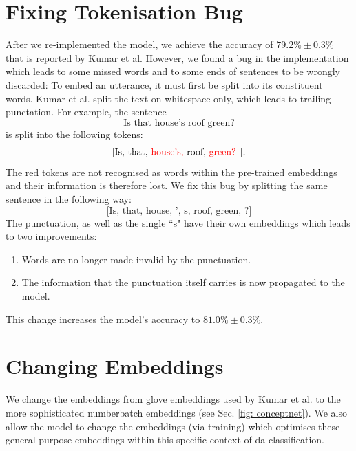     \section{Fixing Tokenisation Bug \label{sec: method tokenisation bug}}
        After we re-implemented the \gls{model}, we achieve the accuracy of $79.2\% \pm 0.3\%$ that is reported by Kumar et al.\cite{kumar2017dialogue}
        However, we found a bug in the implementation which leads to some missed words and to some ends of sentences to be wrongly discarded: To embed an \gls{utterance}, it must first be split into its constituent words. Kumar et al. split the text on whitespace only, which leads to trailing punctation. For example, the sentence
        \begin{equation*}
            \text{Is that house's roof green?}
        \end{equation*}
        is split into the following tokens:
        \begin{equation*}
            \text{[Is, that, \color{red} house's, \color{black} roof, \color{red} green? \color{black}]}.
        \end{equation*}
        The red tokens are not recognised as words within the pre-trained \glspl{embedding} and their information is therefore lost. We fix this bug by splitting the same sentence in the following way:
        \begin{equation*}
            \text{[Is, that, house, ', s, roof, green, ?]}
        \end{equation*}
        The punctuation, as well as the single ``s" have their own \glspl{embedding} which leads to two improvements:
        \begin{enumerate}
            \item Words are no longer made invalid by the punctuation.
            \item The information that the punctuation itself carries is now propagated to the \gls{model}.
        \end{enumerate}
        This change increases the \gls{model}'s accuracy to $81.0\% \pm 0.3\%$.



    \section{Changing Embeddings}
    We change the \glspl{embedding} from \gls{glove} \glspl{embedding} used by Kumar et al.\cite{kumar2017dialogue} to the more sophisticated \gls{numberbatch} \glspl{embedding} (see Sec. \ref{fig: conceptnet}). We also allow the \gls{model} to change the \glspl{embedding} (via training) which optimises these general purpose \glspl{embedding} within this specific context of \gls{da} classification.

